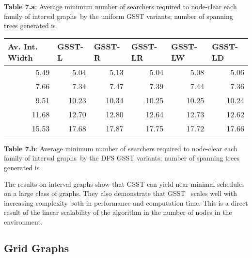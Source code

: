 \documentclass[11pt]{article}\usepackage{amsmath}
\begin{document}
\noindent\textbf{Table 7.a}: Average minimum number of searchers required to
node-clear each family of interval graphs\ by the uniform GSST variants;
number of spanning trees generated is 

\begin{center}
\medskip 

\begin{tabular}
[c]{|l|l|l|l|l|l|}\hline
\textbf{Av. Int. Width} & \textbf{GSST-L} & \textbf{GSST-R} & \textbf{GSST-LR}
& \textbf{GSST-LW} & \textbf{GSST-LD}\\\hline
\multicolumn{1}{|r|}{5.49} & \multicolumn{1}{|r|}{5.04} &
\multicolumn{1}{|r|}{5.13} & \multicolumn{1}{|r|}{5.04} &
\multicolumn{1}{|r|}{5.08} & \multicolumn{1}{|r|}{5.06}\\\hline
\multicolumn{1}{|r|}{7.66} & \multicolumn{1}{|r|}{7.34} &
\multicolumn{1}{|r|}{7.47} & \multicolumn{1}{|r|}{7.39} &
\multicolumn{1}{|r|}{7.44} & \multicolumn{1}{|r|}{7.36}\\\hline
\multicolumn{1}{|r|}{9.51} & \multicolumn{1}{|r|}{10.23} &
\multicolumn{1}{|r|}{10.34} & \multicolumn{1}{|r|}{10.25} &
\multicolumn{1}{|r|}{10.25} & \multicolumn{1}{|r|}{10.24}\\\hline
\multicolumn{1}{|r|}{11.68} & \multicolumn{1}{|r|}{12.70} &
\multicolumn{1}{|r|}{12.80} & \multicolumn{1}{|r|}{12.64} &
\multicolumn{1}{|r|}{12.73} & \multicolumn{1}{|r|}{12.62}\\\hline
\multicolumn{1}{|r|}{15.53} & \multicolumn{1}{|r|}{17.68} &
\multicolumn{1}{|r|}{17.87} & \multicolumn{1}{|r|}{17.75} &
\multicolumn{1}{|r|}{17.72} & \multicolumn{1}{|r|}{17.66}\\\hline
\end{tabular}



\end{center}

\noindent\textbf{Table 7.b}: Average minimum number of searchers required to
node-clear each family of interval graphs\ by the DFS GSST variants; number of
spanning trees generated is 

\bigskip

The results on interval graphs show that GSST can yield near-minimal schedules
on a large class of graphs. They also demonstrate that GSST \ scales well with
increasing complexity both in performance and computation time. This is a
direct result of the linear scalability of the algorithm in the number of
nodes in the environment.

\subsection{Grid Graphs}
\end{document}
